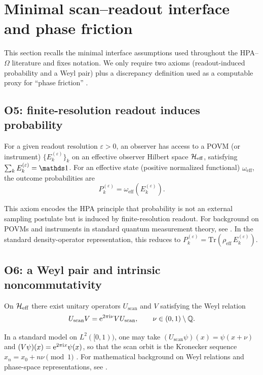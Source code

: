 \section{Minimal scan--readout interface and phase friction}
\label{sec:minimal_interface}

This section recalls the minimal interface assumptions used throughout the HPA--$\Omega$ literature and fixes notation. We only require two axioms (readout-induced probability and a Weyl pair) plus a discrepancy definition used as a computable proxy for ``phase friction'' \cite{Ma2025HPOT,Ma2025HHU,KuipersNiederreiter1974,DrmotaTichy1997}.

\subsection{O5: finite-resolution readout induces probability}
\begin{axiom}\label{ax:O5}
For a given readout resolution $\varepsilon>0$, an observer has access to a POVM (or instrument) $\{E_k^{(\varepsilon)}\}_k$ on an effective observer Hilbert space $\mathcal{H}_{\mathrm{eff}}$, satisfying $\sum_k E_k^{(\varepsilon)}=\id$. For an effective state (positive normalized functional) $\omega_{\mathrm{eff}}$, the outcome probabilities are
\begin{equation}
P_k^{(\varepsilon)}=\omega_{\mathrm{eff}}\!\left(E_k^{(\varepsilon)}\right).
\end{equation}
\end{axiom}
This axiom encodes the HPA principle that probability is not an external sampling postulate but is induced by finite-resolution readout. For background on POVMs and instruments in standard quantum measurement theory, see \cite{NielsenChuang2010}.
In the standard density-operator representation, this reduces to $P_k^{(\varepsilon)}=\mathrm{Tr}(\rho_{\mathrm{eff}}\,E_k^{(\varepsilon)})$.

\subsection{O6: a Weyl pair and intrinsic noncommutativity}
\begin{axiom}\label{ax:O6}
On $\mathcal{H}_{\mathrm{eff}}$ there exist unitary operators $U_{\mathrm{scan}}$ and $V$ satisfying the Weyl relation
\begin{equation}
U_{\mathrm{scan}}V=\mathrm{e}^{2\pi\mathrm{i}\nu}VU_{\mathrm{scan}},
\qquad
\nu\in(0,1)\setminus\mathbb{Q}.
\end{equation}
\end{axiom}
In a standard model on $L^2([0,1))$, one may take $(U_{\mathrm{scan}}\psi)(x)=\psi(x+\nu)$ and $(V\psi)(x)=\mathrm{e}^{2\pi\mathrm{i} x}\psi(x)$, so that the scan orbit is the Kronecker sequence $x_n=x_0+n\nu \pmod{1}$ \cite{Ma2025HHU}.
For mathematical background on Weyl relations and phase-space representations, see \cite{Folland1989}.

